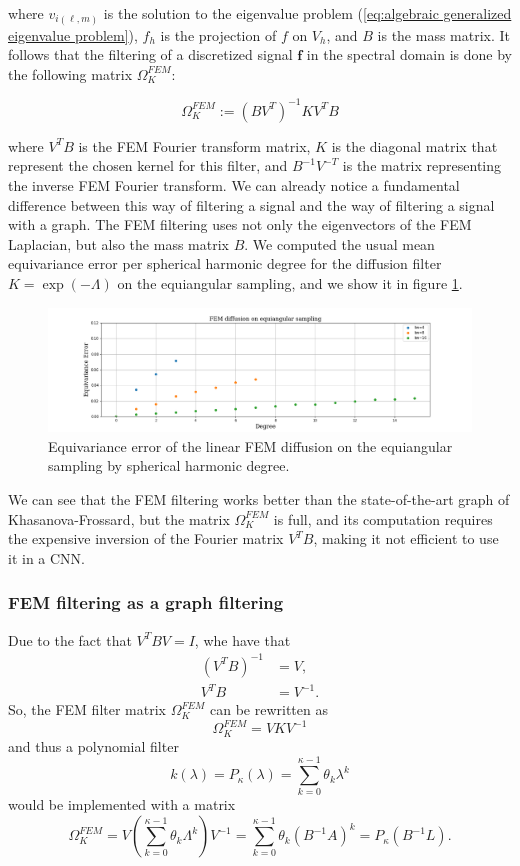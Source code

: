 where $v_{i(\ell, m)}$ is the solution to the eigenvalue problem (\ref{eq:algebraic generalized eigenvalue problem}), $f_h$ is the projection of $f$ on $V_h$, and $B$ is the mass matrix. It follows that the filtering of a discretized signal $\mathbf f$ in the spectral domain is done by the following matrix  $\Omega_K^{FEM}$:

\begin{equation}\label{eq:FEM filtering}
	 \Omega_K^{FEM} := (BV^T)^{-1}KV^TB
\end{equation}

where $V^TB$ is the FEM Fourier transform matrix, $K$ is the diagonal matrix that represent the chosen kernel for this filter, and $B^{-1}V^{-T}$ is the matrix representing the inverse FEM Fourier transform. We can already notice a fundamental difference between this way of filtering a signal and the way of filtering a signal with a graph. The FEM filtering uses not only the eigenvectors of the FEM Laplacian, but also the mass matrix $B$. We computed the usual mean equivariance error per spherical harmonic degree for the diffusion filter $K=\exp(-\Lambda)$ on the equiangular sampling, and we show it in figure \ref{fig:FEM diffusion}.
\begin{figure}[h]
	\centering
	\includegraphics[width=\textwidth]{../codes/06.Equivariance_error/FEMdiffusiononequiangularsampling.png}
	\caption{\label{fig:FEM diffusion}Equivariance error of the linear FEM diffusion on the equiangular sampling by spherical harmonic degree.}
\end{figure}
We can see that the FEM filtering works better than the state-of-the-art graph of Khasanova-Frossard, but the matrix $\Omega_K^{FEM}$ is full, and its computation requires the expensive inversion of the Fourier matrix $V^TB$, making it not efficient to use it in a CNN. 
\subsubsection{FEM filtering as a graph filtering}\label{sec:FEM filtering as a graph filtering}
Due to the fact that 
$
V^TBV = I
$,
whe have that 
$$
\begin{aligned}
	(V^TB)^{-1} &= V,\\
	V^TB &= V^{-1}.
\end{aligned}
$$
So, the FEM filter matrix $\Omega_K^{FEM}$ can be rewritten as 
\begin{equation}\label{eq:FEM filter simple}
	 \Omega_K^{FEM}  = V K V^{-1}
\end{equation}
and thus a polynomial filter
$$
k(\lambda)=P_\kappa(\lambda) = \sum_{k=0}^{\kappa-1} \theta_k \lambda^k
$$
would be implemented with a matrix
$$
\Omega_K^{FEM} = V \left(\sum_{k=0}^{\kappa-1} \theta_k \Lambda^k \right)V^{-1} = \sum_{k=0}^{\kappa-1} \theta_k (B^{-1}A)^k = P_\kappa(B^{-1}L).
$$

